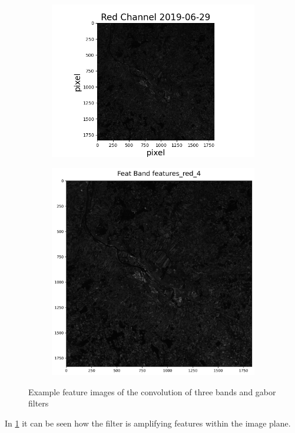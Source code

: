 \documentclass[12pt,a4paper, english,twoside]{article}
\begin{document}
      \begin{figure}
        \begin{subfigure}[b]{0.5\textwidth}
          \includegraphics[width=\textwidth]{img/RedChannel2019-06-29.png}
        \end{subfigure}
        \begin{subfigure}[b]{0.5\textwidth}
          \includegraphics[width=\textwidth]{img/Features_red4.png}
        \end{subfigure}
       \caption{Example feature images of the convolution of three bands and gabor filters\label{fig:gaborresults}}
      \end{figure}
      In \cref{fig:gaborresults} it can be seen how the filter is amplifying features within the image plane. \\ 
     
\end{document}
